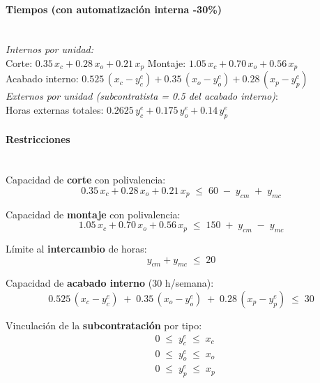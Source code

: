 \paragraph{Tiempos (con automatización interna -30\%)}\mbox{}\\
\emph{Internos por unidad:}\\
\hspace*{1em}Corte: $0.35\,x_c + 0.28\,x_o + 0.21\,x_p$ \quad
Montaje: $1.05\,x_c + 0.70\,x_o + 0.56\,x_p$ \\
\hspace*{1em}Acabado interno: $0.525\,(x_c - y_c^{e}) + 0.35\,(x_o - y_o^{e}) + 0.28\,(x_p - y_p^{e})$\\
\emph{Externos por unidad (subcontratista = 0.5 del acabado interno)}:\\
\hspace*{1em}Horas externas totales: $0.2625\,y_c^{e} + 0.175\,y_o^{e} + 0.14\,y_p^{e}$

\paragraph{Restricciones}\mbox{}\\
Capacidad de \textbf{corte} con polivalencia:
\begin{equation}
    0.35\,x_c + 0.28\,x_o + 0.21\,x_p \;\leq\; 60 \;-\; y_{cm} \;+\; y_{mc}
\end{equation}

Capacidad de \textbf{montaje} con polivalencia:
\begin{equation}
    1.05\,x_c + 0.70\,x_o + 0.56\,x_p \;\leq\; 150 \;+\; y_{cm} \;-\; y_{mc}
\end{equation}

Límite al \textbf{intercambio} de horas:
\begin{equation}
    y_{cm} + y_{mc} \;\leq\; 20
\end{equation}

Capacidad de \textbf{acabado interno} (30 h/semana):
\begin{equation}
    0.525\,(x_c - y_c^{e}) \;+\; 0.35\,(x_o - y_o^{e}) \;+\; 0.28\,(x_p - y_p^{e}) \;\leq\; 30
\end{equation}

Vinculación de la \textbf{subcontratación} por tipo:
\begin{align}
    & 0 \;\leq\; y_c^{e} \;\leq\; x_c \\
    & 0 \;\leq\; y_o^{e} \;\leq\; x_o \\
    & 0 \;\leq\; y_p^{e} \;\leq\; x_p 
\end{align}

